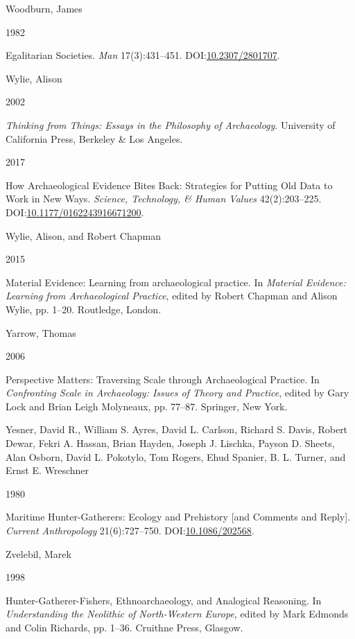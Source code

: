 \documentclass[
  12pt,
  a4paper,
  oneside]{book}
\newlength{\cslhangindent}
\newlength{\csllabelwidth}
\newlength{\cslentryspacingunit} %
\newenvironment{CSLReferences}[2] %
 {%
  \setlength{\parindent}{0pt}
  \ifodd #1
  \let\oldpar\par
  \def\par{\hangindent=\cslhangindent\oldpar}
  \fi
  \setlength{\parskip}{#2\cslentryspacingunit}
 }%
 {}
\newcommand{\CSLBlock}[1]{#1\hfill\break}
\newcommand{\CSLLeftMargin}[1]{\parbox[t]{\csllabelwidth}{#1}}
\newcommand{\CSLRightInline}[1]{\parbox[t]{\linewidth - \csllabelwidth}{#1}\break}
\begin{document}
\begin{CSLReferences}{0}{0}
\leavevmode{}%
\CSLBlock{Woodburn, James}
\CSLLeftMargin{ 1982}
\CSLRightInline{{Egalitarian Societies}. \emph{Man} 17(3):431--451. DOI:\href{https://doi.org/10.2307/2801707}{10.2307/2801707}.}

\leavevmode{}%
\CSLBlock{Wylie, Alison}
\CSLLeftMargin{ 2002}
\CSLRightInline{\emph{{Thinking from Things: Essays in the Philosophy of Archaeology}}. University of California Press, Berkeley \& Los Angeles.}

\leavevmode{}%
\CSLLeftMargin{ 2017 }
\CSLRightInline{{How Archaeological Evidence Bites Back: Strategies for Putting Old Data to Work in New Ways}. \emph{Science, Technology, \& Human Values} 42(2):203--225. DOI:\href{https://doi.org/10.1177/0162243916671200}{10.1177/0162243916671200}.}

\leavevmode{}%
\CSLBlock{Wylie, Alison, and Robert Chapman}
\CSLLeftMargin{ 2015}
\CSLRightInline{{Material Evidence: Learning from archaeological practice}. In \emph{{Material Evidence: Learning from Archaeological Practice}}, edited by Robert Chapman and Alison Wylie, pp. 1--20. Routledge, London.}

\leavevmode{}%
\CSLBlock{Yarrow, Thomas}
\CSLLeftMargin{ 2006}
\CSLRightInline{{Perspective Matters: Traversing Scale through Archaeological Practice}. In \emph{{Confronting Scale in Archaeology: Issues of Theory and Practice}}, edited by Gary Lock and Brian Leigh Molyneaux, pp. 77--87. Springer, New York.}

\leavevmode{}%
\CSLBlock{Yesner, David R., William S. Ayres, David L. Carlson, Richard S. Davis, Robert Dewar, Fekri A. Hassan, Brian Hayden, Joseph J. Lischka, Payson D. Sheets, Alan Osborn, David L. Pokotylo, Tom Rogers, Ehud Spanier, B. L. Turner, and Ernst E. Wreschner}
\CSLLeftMargin{ 1980}
\CSLRightInline{{Maritime Hunter-Gatherers: Ecology and Prehistory {[}and Comments and Reply{]}}. \emph{Current Anthropology} 21(6):727--750. DOI:\href{https://doi.org/10.1086/202568}{10.1086/202568}.}

\leavevmode{}%
\CSLBlock{Zvelebil, Marek}
\CSLLeftMargin{ 1998}
\CSLRightInline{{Hunter-Gatherer-Fishers, Ethnoarchaeology, and Analogical Reasoning}. In \emph{{Understanding the Neolithic of North-Western Europe}}, edited by Mark Edmonds and Colin Richards, pp. 1--36. Cruithne Press, Glasgow.}

\end{CSLReferences}
\end{document}
